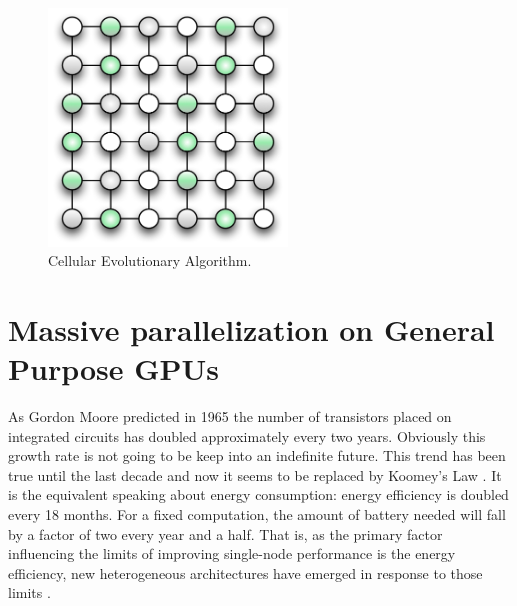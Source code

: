 \documentclass{article}
\begin{document}
\begin{description}
\begin{figure}[tb]
\centering
\includegraphics[width=15pc]{cellular}
\caption{Cellular Evolutionary Algorithm.}
\label{fig:cellular}
\end{figure}

\end{description}






\section{Massive parallelization on General Purpose GPUs}
\label{sec:parall_and_GPUs}

As Gordon Moore predicted in 1965 the number of transistors placed on
integrated circuits has doubled approximately every two years. %
Obviously this growth rate is not going to be keep into an indefinite future. This trend has been true until the last decade and now it seems to be replaced by Koomey's Law \cite{10.1109/MAHC.2010.28}. It is the equivalent speaking about energy consumption: energy efficiency is doubled every 18 months. For a fixed computation, the amount of battery needed will fall by a factor of two every year and a half. That is, as the primary factor influencing the limits of improving single-node performance is the energy efficiency, new heterogeneous architectures have emerged in response to those limits \cite{VetterHeterogeneous11}.
\end{document}
